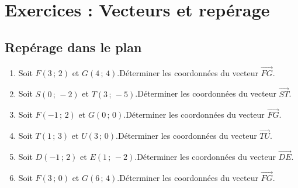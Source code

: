 \bigskip

\newpage

\section*{Exercices : Vecteurs et repérage}
{\setlength{\columnseprule}{0pt}
\setcounter{NumEx}{1}



\subsection*{Repérage dans le plan}


\begin{Exercice}%
\leavevmode\vspace{-\baselineskip}
\begin{enumerate}[itemsep=1em]
	\item \begin{minipage}[t]{\linewidth}Soit $F\left(3\,;\,2\right)$ et $G\left(4\,;\,4\right)$.Déterminer les coordonnées du vecteur $\overrightarrow{FG}$.\end{minipage}
	\item \begin{minipage}[t]{\linewidth}Soit $S\left(0\,;\,-2\right)$ et $T\left(3\,;\,-5\right)$.Déterminer les coordonnées du vecteur $\overrightarrow{ST}$.\end{minipage}
	\item \begin{minipage}[t]{\linewidth}Soit $F\left(-1\,;\,2\right)$ et $G\left(0\,;\,0\right)$.Déterminer les coordonnées du vecteur $\overrightarrow{FG}$.\end{minipage}
	\item \begin{minipage}[t]{\linewidth}Soit $T\left(1\,;\,3\right)$ et $U\left(3\,;\,0\right)$.Déterminer les coordonnées du vecteur $\overrightarrow{TU}$.\end{minipage}
	\item \begin{minipage}[t]{\linewidth}Soit $D\left(-1\,;\,2\right)$ et $E\left(1\,;\,-2\right)$.Déterminer les coordonnées du vecteur $\overrightarrow{DE}$.\end{minipage}
	\item \begin{minipage}[t]{\linewidth}Soit $F\left(3\,;\,0\right)$ et $G\left(6\,;\,4\right)$.Déterminer les coordonnées du vecteur $\overrightarrow{FG}$.\end{minipage}

\end{enumerate}
\end{Exercice}}
